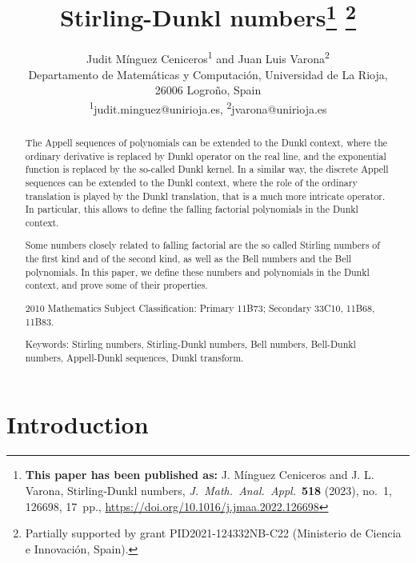 \documentclass[11pt,a4paper]{article}
\title{Stirling-Dunkl numbers\footnote{\textbf{This paper has been published as:}
J. M\'inguez Ceniceros and J. L. Varona, 
Stirling-Dunkl numbers,
\textit{J.~Math.\ Anal.\ Appl.}\ \textbf{518} (2023), no.~1, 126698, 17~pp., 
\url{https://doi.org/10.1016/j.jmaa.2022.126698}}
\footnote{Partially supported by grant PID2021-124332NB-C22 
(Mi\-nis\-te\-rio de Cien\-cia e Inno\-va\-ci\'on, Spain).}}
\author{Judit M\'inguez Ceniceros\textsuperscript{1}
and Juan Luis Varona\textsuperscript{2}\\[6pt]
\small Departamento de Matem\'aticas y Computaci\'on, 
Universidad de La Rioja,\\[-2pt]
\small 26006 Logro\~no, Spain\\[3pt]
\small \textsuperscript{1}{judit.minguez@unirioja.es},
\textsuperscript{2}{jvarona@unirioja.es}}
\date{}
\theoremstyle{plain}
\theoremstyle{remark}
\begin{document}

\maketitle

\begin{abstract}
The Appell sequences of polynomials can be extended to the Dunkl context, where the ordinary derivative is replaced by Dunkl operator on the real line, and the exponential function is replaced by the so-called Dunkl kernel. In a similar way, the discrete Appell sequences can be extended to the Dunkl context, where the role of the ordinary translation is played by the Dunkl translation, that is a much more intricate operator. In particular, this allows to define the falling factorial polynomials in the Dunkl context.

Some numbers closely related to falling factorial are the so called Stirling numbers of the first kind and of the second kind, as well as the Bell numbers and the Bell polynomials. In this paper, we define these numbers and polynomials in the Dunkl context, and prove some of their properties.

2010 Mathematics Subject Classification: Primary 11B73; Secondary 33C10, 11B68, 11B83.

Keywords: Stirling numbers, Stirling-Dunkl numbers, Bell numbers, Bell-Dunkl numbers, Appell-Dunkl sequences, Dunkl transform.
\end{abstract}


\section{Introduction}
\end{document}
